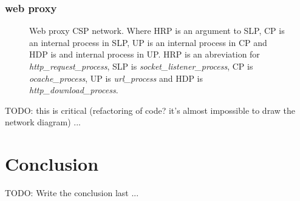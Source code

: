 \documentclass[a4paper,12pt]{article}
\begin{document}
\subsubsection{web proxy}
\begin{figure}[h]
  \begin{center}
  \end{center}
  \caption{Web proxy CSP network. Where HRP is an argument to SLP, CP is an
    internal process in SLP, UP is an internal process in CP and HDP is and
    internal process in UP. HRP is an abreviation for {\it http\_request\_process},
    SLP is {\it socket\_listener\_process}, CP is {\it ocache\_process}, UP is
    {\it url\_process} and HDP is {\it http\_download\_process}.}
  \label{webproxy}
\end{figure}


TODO: this is critical (refactoring of code? it's almost impossible to draw
the network diagram) ...

\section{Conclusion}
\label{conclusion}

TODO: Write the conclusion last ...


\end{document}
